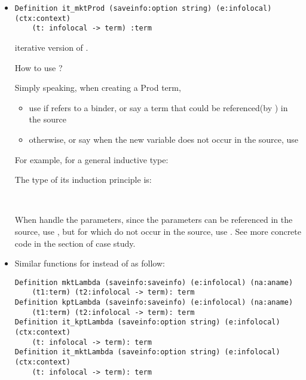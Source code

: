 \documentclass[a4paper,UKenglish,cleveref, autoref, thm-restate]{lipics-v2021}
\begin{document}
\begin{itemize}
\item
\begin{lstlisting}[language = {Coq}, basicstyle = \small]
Definition it_mktProd (saveinfo:option string) (e:infolocal) (ctx:context)
    (t: infolocal -> term) :term
\end{lstlisting}
iterative version of .




\begin{remark}\label{choosetProd}
How to use  ?

Simply speaking, when creating a Prod term,

\begin{itemize}
    \item use  if  refers to a binder, or say a term that could be referenced(by ) in the source
    \item otherwise, or say when the new variable does not occur in the source, use  
\end{itemize}



  For example, for a general inductive type:


The type of its induction principle is:


~~

When handle the parameters, since the parameters can be referenced in the source, use , but for  which do not occur in the source, use . See more concrete code in the section of case study.
\end{remark}


\item
Similar functions for  instead of  as follow:
\begin{lstlisting}[language = {Coq}, basicstyle = \small]
Definition mktLambda (saveinfo:saveinfo) (e:infolocal) (na:aname)
    (t1:term) (t2:infolocal -> term): term
Definition kptLambda (saveinfo:saveinfo) (e:infolocal) (na:aname)
    (t1:term) (t2:infolocal -> term): term
Definition it_kptLambda (saveinfo:option string) (e:infolocal) (ctx:context)
    (t: infolocal -> term): term
Definition it_mktLambda (saveinfo:option string) (e:infolocal) (ctx:context)
    (t: infolocal -> term): term
\end{lstlisting}

\end{itemize}
\end{document}
